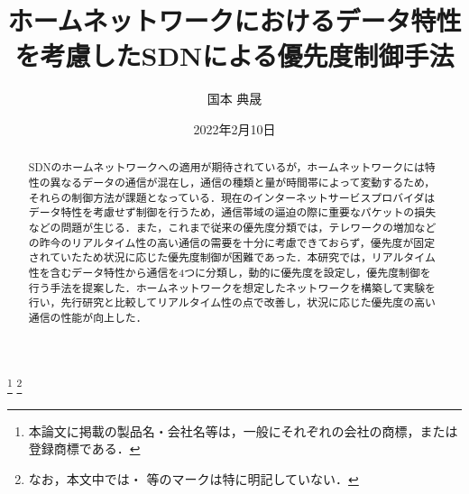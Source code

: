 \documentclass[a4paper,11pt,uplatex]{ujreport}
\title{ホームネットワークにおけるデータ特性を考慮したSDNによる優先度制御手法}  %
\author{国本 典晟}  %
\date{2022年2月10日}  %
\begin{document}
\maketitle
\clearpage

\begin{abstract}

  SDNのホームネットワークへの適用が期待されているが，ホームネットワークには特性の異なるデータの通信が混在し，通信の種類と量が時間帯によって変動するため，それらの制御方法が課題となっている．現在のインターネットサービスプロバイダはデータ特性を考慮せず制御を行うため，通信帯域の逼迫の際に重要なパケットの損失などの問題が生じる．また，これまで従来の優先度分類では，テレワークの増加などの昨今のリアルタイム性の高い通信の需要を十分に考慮できておらず，優先度が固定されていたため状況に応じた優先度制御が困難であった．本研究では，リアルタイム性を含むデータ特性から通信を4つに分類し，動的に優先度を設定し，優先度制御を行う手法を提案した．ホームネットワークを想定したネットワークを構築して実験を行い，先行研究と比較してリアルタイム性の点で改善し，状況に応じた優先度の高い通信の性能が向上した．

\end{abstract}


\footnote[0]{本論文に掲載の製品名・会社名等は，一般にそれぞれの会社の商標，または登録商標である．}
\footnote[0]{なお，本文中では\texttrademark ・ \textregistered 等のマークは特に明記していない．}

\end{document}
